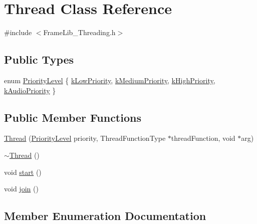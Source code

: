 \hypertarget{class_thread}{}\section{Thread Class Reference}
\label{class_thread}


{\ttfamily \#include $<$Frame\+Lib\+\_\+\+Threading.\+h$>$}

\subsection*{Public Types}
\begin{DoxyCompactItemize}
\item 
enum \hyperlink{class_thread_a42f854dd02a3640e422b2f3288067744}{Priority\+Level} \{ \hyperlink{class_thread_a42f854dd02a3640e422b2f3288067744ae20f890967b6df0a8aa24cf670a1cad6}{k\+Low\+Priority}, 
\hyperlink{class_thread_a42f854dd02a3640e422b2f3288067744ad4857183cc85091bf07a0f9c041db327}{k\+Medium\+Priority}, 
\hyperlink{class_thread_a42f854dd02a3640e422b2f3288067744a7ab7b3dc443fa32c450094df3cfeb2f4}{k\+High\+Priority}, 
\hyperlink{class_thread_a42f854dd02a3640e422b2f3288067744af64d747a911dc5f1878e4c4a945d2bb5}{k\+Audio\+Priority}
 \}
\end{DoxyCompactItemize}
\subsection*{Public Member Functions}
\begin{DoxyCompactItemize}
\item 
\hyperlink{class_thread_ac97b1f37fb35b96d2dc27cc40e9e60ab}{Thread} (\hyperlink{class_thread_a42f854dd02a3640e422b2f3288067744}{Priority\+Level} priority, Thread\+Function\+Type $\ast$thread\+Function, void $\ast$arg)
\item 
\hyperlink{class_thread_a37d9edd3a1a776cbc27dedff949c9726}{$\sim$\+Thread} ()
\item 
void \hyperlink{class_thread_a1f53ee62bd30a7924186ef26150ce262}{start} ()
\item 
void \hyperlink{class_thread_a4d9d788e98388a3217831a9046709deb}{join} ()
\end{DoxyCompactItemize}


\subsection{Member Enumeration Documentation}
\mbox{\label{class_thread_a42f854dd02a3640e422b2f3288067744}} 
